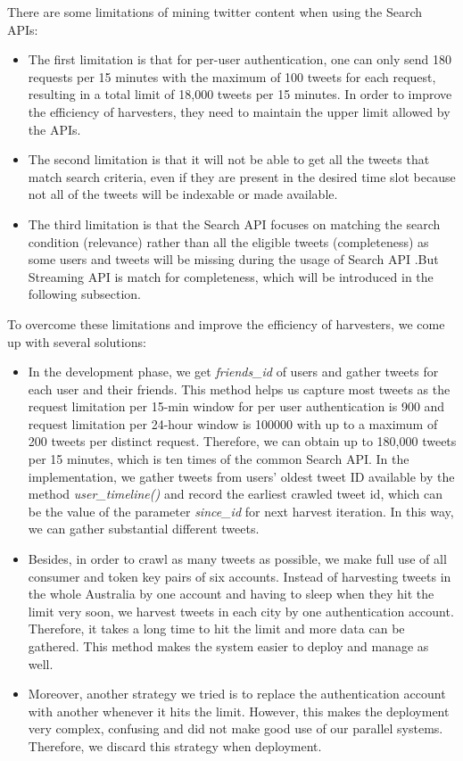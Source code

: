 \documentclass{article}
\begin{document}
There are some limitations of mining twitter content when using the Search APIs:
\begin{itemize}
    \item The first limitation is that for per-user authentication, one can only send 180 requests per 15 minutes with the maximum of 100 tweets for each request, resulting in a total limit of 18,000 tweets per 15 minutes. In order to improve the efficiency of harvesters, they need to maintain the upper limit allowed by the APIs.
    \item The second limitation is that it will not be able to get all the tweets that match search criteria, even if they are present in the desired time slot because not all of the tweets will be indexable or made available.
    \item The third limitation is that the Search API focuses on matching the search condition (relevance) rather than all the eligible tweets (completeness) as some users and tweets will be missing during the usage of Search API
    \cite{Standard-search}.But Streaming API is match for completeness, which will be introduced in the following subsection.
\end{itemize}
To overcome these limitations and improve the efficiency of harvesters, we come up with several solutions:
\begin{itemize}
    \item In the development phase, we get \textit{friends\_id} of users and gather tweets for each user and their friends. This method helps us capture most tweets as the request limitation per 15-min window for per user authentication is 900 and request limitation per 24-hour window is 100000 with up to a maximum of 200 tweets per distinct request. Therefore, we can obtain up to 180,000 tweets per 15 minutes, which is ten times of the common Search API. In the implementation, we gather tweets from users’ oldest tweet ID available by the method \textit{user\_timeline()} and record the earliest crawled tweet id, which can be the value of the parameter \textit{since\_id} for next harvest iteration. In this way, we can gather substantial different tweets.
    \item Besides, in order to crawl as many tweets as possible, we make full use of all consumer and token key pairs of six accounts. Instead of harvesting tweets in the whole Australia by one account and having to sleep when they hit the limit very soon, we harvest tweets in each city by one authentication account. Therefore, it takes a long time to hit the limit and more data can be gathered. This method makes the system easier to deploy and manage as well.
    \item Moreover, another strategy we tried is to replace the authentication account with another whenever it hits the limit. However, this makes the deployment very complex, confusing and did not make good use of our parallel systems. Therefore, we discard this strategy when deployment.
\end{itemize}
\end{document}
